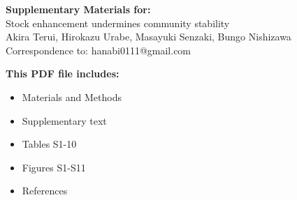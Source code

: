 \begin{center}
\LARGE{\textbf{Supplementary Materials for:}}\\[7.5mm]
\LARGE{Stock enhancement undermines community stability}\\[7.5mm]
\large{Akira Terui, Hirokazu Urabe, Masayuki Senzaki, Bungo Nishizawa}\\[7.5mm]
\large{Correspondence to: hanabi0111@gmail.com}\\[15mm]
\end{center}
\begin{flushleft}
\textbf{This PDF file includes:}
\begin{itemize}
\item Materials and Methods
\item Supplementary text
\item Tables S1-10
\item Figures S1-S11
\item References
\end{itemize}
\end{flushleft}

\newpage